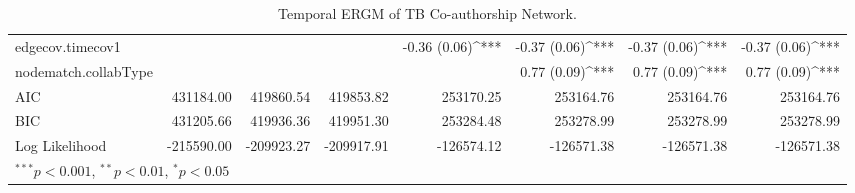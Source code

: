 \begin{table}
\begin{center}
\begin{tabular}{l D{)}{)}{11)3} D{)}{)}{12)3} D{)}{)}{12)3} D{)}{)}{11)3} D{)}{)}{11)3} D{)}{)}{11)3} D{)}{)}{11)3} }
edgecov.timecov1               &                       &                        &                        & -0.36 \; (0.06)^{***} & -0.37 \; (0.06)^{***} & -0.37 \; (0.06)^{***} & -0.37 \; (0.06)^{***} \\
nodematch.collabType           &                       &                        &                        &                       & 0.77 \; (0.09)^{***}  & 0.77 \; (0.09)^{***}  & 0.77 \; (0.09)^{***}  \\
\midrule
AIC                            & 431184.00             & 419860.54              & 419853.82              & 253170.25             & 253164.76             & 253164.76             & 253164.76             \\
BIC                            & 431205.66             & 419936.36              & 419951.30              & 253284.48             & 253278.99             & 253278.99             & 253278.99             \\
Log Likelihood                 & -215590.00            & -209923.27             & -209917.91             & -126574.12            & -126571.38            & -126571.38            & -126571.38            \\
\bottomrule
{}
\end{tabular}
\caption{Temporal ERGM of TB Co-authorship Network.}
\label{tab:tb_tergm}
\end{center}
\end{table}
